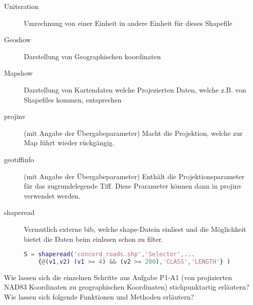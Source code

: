 \begin{description}
	\item[Unitsration] Umrechnung von einer Einheit in andere Einheit für dieses Shapefile
	\item[Geoshow] Darstellung von Geographischen koordinaten
	\item[Mapshow] Darstellung von Kartendaten welche Projezierten Daten, welche z.B. von Shapefiles kommen, entsprechen
	\item[projinv] (mit Angabe der Übergabeparameter) Macht die Projektion, welche zur Map führt wieder rückgängig.
	\item[geotiffinfo] (mit Angabe der Übergabeparameter) Enthält die Projektionsparameter für das zugrundelegende Tiff. Diese Prarameter können dann in projinv verwendet werden.
	\item[shaperead] Vermutlich externe bib, welche shape-Datein einliest und die Möglichkeit bietet die Daten beim einlesen schon zu filter.
	\begin{lstlisting}[caption=shaperead.m, language=matlab, label=shaperead]
	S = shaperead('concord_roads.shp','Selector',... 
	{@(v1,v2) (v1 >= 4) && (v2 >= 200),'CLASS','LENGTH'} )
	\end{lstlisting}
	
\end{description}

Wie lassen sich die einzelnen Schritte aus Aufgabe P1-A1 (von projizierten NAD83 Koordinaten zu geographischen Koordinaten) stichpunktartig erläutern?
Wie lassen sich folgende Funktionen und Methoden erläutern? \cite{adams2009hitchhikers}





